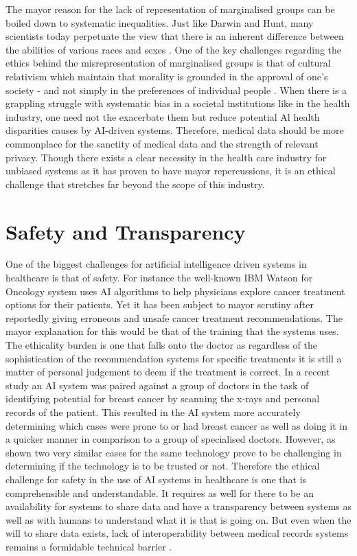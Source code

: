 \documentclass[a4paper,12pt,oneside]{report}
\begin{document}
The mayor reason for the lack of representation of marginalised groups can be boiled down to systematic inequalities. Just like Darwin and Hunt, many scientists today perpetuate the view that there is an inherent difference between the abilities of various races and sexes \cite{2}. One of the key challenges regarding the ethics behind the misrepresentation of marginalised groups is that of cultural relativism which maintain that morality is grounded in the approval of one's society - and not simply in the preferences of individual people \cite{3}. 
When there is a grappling struggle with systematic bias in a societal institutions like in the health industry, one need not the exacerbate them but reduce potential Al health disparities causes by AI-driven systems. Therefore, medical data should be more commonplace for the sanctity of medical data and the strength of relevant privacy. Though there exists a clear necessity in the health care industry for unbiased systems as it has proven to have mayor repercussions, it is an ethical challenge that stretches far beyond the scope of this industry. 

\section{Safety and Transparency}

One of the biggest challenges for artificial intelligence driven systems in healthcare is that of safety. For instance the well-known IBM Watson for Oncology system uses AI algorithms to help physicians explore cancer treatment options for their patients. Yet it has been subject to mayor scrutiny after reportedly giving erroneous and unsafe cancer treatment recommendations. The mayor explanation for this would be that of the training that the systems uses. The ethicality burden is one that falls onto the doctor as regardless of the sophistication of the recommendation systems for specific treatments it is still a matter of personal judgement to deem if the treatment is correct. In a recent study an AI system was paired against a group of doctors in the task of identifying potential for breast cancer by scanning the x-rays and personal records of the patient. This resulted in the AI system more accurately determining which cases were prone to or had breast cancer as well as doing it in a quicker manner in comparison to a group of specialised doctors. However, as shown two very similar cases for the same technology prove to be challenging in determining if the technology is to be trusted or not. Therefore the ethical challenge for safety in the use of AI systems in healthcare is one that is comprehensible and understandable. It requires as well for there to be an availability for systems to share data and have a transparency between systems as well as with humans to understand what it is that is going on. But even when the will to share data exists, lack of interoperability between medical records systems remains a formidable technical barrier \cite{6}. 
\end{document}
